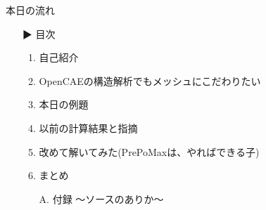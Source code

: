 \begin{frame}{本日の流れ}
  \begin{itemize}
    \item[▶] 目次
    \begin{enumerate}[label=\textbf{ \arabic*.},itemsep=1.3ex, leftmargin=1cm]
      \item 自己紹介
      \item OpenCAEの構造解析でもメッシュにこだわりたい
      \item 本日の例題
      \item 以前の計算結果と指摘
      \item 改めて解いてみた(PrePoMaxは、やればできる子)
      \item まとめ
      \item[A.] 付録 ～ソースのありか～
    \end{enumerate}
  \end{itemize}
\end{frame}
